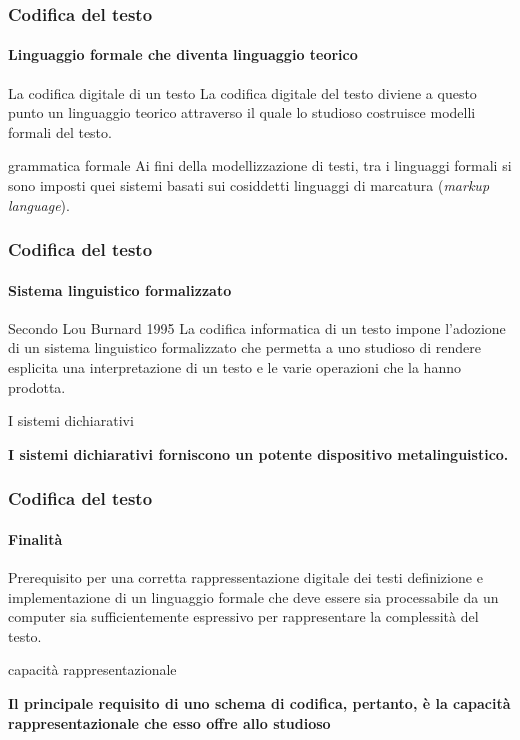 \begin{frame}
	\frametitle{Codifica del testo}
	\framesubtitle{Linguaggio formale che diventa linguaggio teorico}
	\addtocounter{nframe}{1}

	\begin{block}{La codifica digitale di un testo}
		La codifica digitale del testo diviene a questo punto un linguaggio teorico attraverso il quale lo studioso costruisce modelli formali del testo.
	\end{block}

	\begin{block}{grammatica formale}
		Ai fini della modellizzazione di testi, tra i linguaggi formali si sono imposti quei sistemi basati sui cosiddetti linguaggi di marcatura (\textit{markup language}).
	\end{block}
\end{frame}


\begin{frame}
	\frametitle{Codifica del testo}
	\framesubtitle{Sistema linguistico formalizzato}
	\addtocounter{nframe}{1}

	\begin{block}{Secondo Lou Burnard 1995}
		La codifica informatica di un testo impone l'adozione di un sistema linguistico formalizzato che permetta a uno studioso di rendere esplicita una interpretazione di un testo e le varie operazioni che la hanno prodotta.
	\end{block}

	\begin{block}{I sistemi dichiarativi}
		\begin{center}
			\textbf{I sistemi dichiarativi forniscono un potente dispositivo metalinguistico.}
		\end{center}
	\end{block}

\end{frame}

\begin{frame}
	\frametitle{Codifica del testo}
	\framesubtitle{Finalità}
	\addtocounter{nframe}{1}

	\begin{block}{Prerequisito per una corretta rappressentazione digitale dei testi}
		definizione e implementazione di un linguaggio formale che deve essere sia processabile da un computer sia sufficientemente espressivo per rappresentare la complessità del testo.
	\end{block}

	\begin{block}{capacità rappresentazionale}
		\begin{center}
			\textbf{Il principale requisito di uno schema di codifica, pertanto, è la capacità rappresentazionale che esso offre allo studioso}
		\end{center}
	\end{block}

\end{frame}

